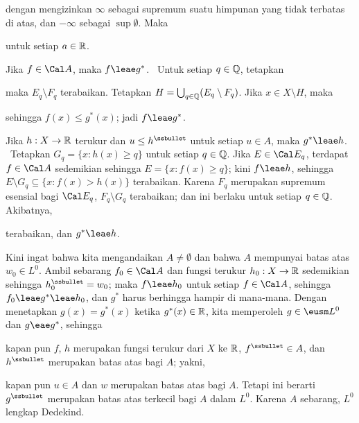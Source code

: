 {

\noindent dengan mengizinkan $\infty$ sebagai supremum suatu himpunan
yang tidak terbatas di atas, dan $-\infty$ sebagai $\sup\emptyset$.
Maka


\noindent untuk setiap $a\in\Bbb R$.

Jika $f\in\Cal A$, maka $f\leae g^*$. \Prf\ Untuk setiap
$q\in\Bbb Q$, tetapkan


\noindent maka $E_q\setminus F_q$ terabaikan. Tetapkan
$H=\bigcup_{q\in\Bbb Q}(E_q\setminus F_q)$. Jika $x\in X\setminus H$,
maka


\noindent sehingga $f(x)\le g^*(x)$; jadi $f\leae g^*$.\ \Qed

Jika $h:X\to\Bbb R$ terukur dan $u\le h^{\ssbullet}$ untuk setiap
$u\in A$, maka $g^*\leae h$. \Prf\ Tetapkan
$G_q=\{x:h(x)\ge q\}$ untuk setiap $q\in\Bbb Q$. Jika
$E\in\Cal E_q$, terdapat $f\in\Cal A$ sedemikian sehingga
$E=\{x:f(x)\ge q\}$; kini $f\leae h$, sehingga
$E\setminus G_q\subseteq\{x:f(x)>h(x)\}$ terabaikan. Karena $F_q$
merupakan supremum esensial bagi $\Cal E_q$, $F_q\setminus G_q$
terabaikan; dan ini berlaku untuk setiap $q\in\Bbb Q$. Akibatnya,


\noindent terabaikan, dan $g^*\leae h$.\ \Qed

Kini ingat bahwa kita mengandaikan $A\ne\emptyset$ dan bahwa $A$
mempunyai batas atas $w_0\in L^0$. Ambil sebarang $f_0\in\Cal A$ dan
fungsi terukur $h_0:X\to\Bbb R$ sedemikian sehingga
$h_0^{\ssbullet}=w_0$; maka $f\leae h_0$ untuk setiap $f\in\Cal A$,
sehingga $f_0\leae g^*\leae h_0$, dan $g^*$ harus berhingga hampir di
mana-mana. Dengan menetapkan $g(x)=g^*(x)$ ketika $g^*(x)\in\Bbb R$,
kita memperoleh $g\in\eusm L^0$ dan $g\eae g^*$, sehingga


\noindent kapan pun $f$, $h$ merupakan fungsi terukur dari $X$ ke
$\Bbb R$, $f^{\ssbullet}\in A$, dan $h^{\ssbullet}$ merupakan batas
atas bagi $A$; yakni,


\noindent kapan pun $u\in A$ dan $w$ merupakan batas atas bagi $A$.
Tetapi ini berarti $g^{\ssbullet}$ merupakan batas atas terkecil bagi
$A$ dalam $L^0$. Karena $A$ sebarang, $L^0$ lengkap Dedekind.

}
